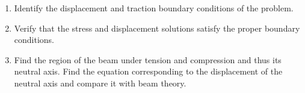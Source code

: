 \begin{enumerate}

\begin{enumerate}
\item Identify the displacement and traction boundary conditions of the problem.
\item Verify that the stress and displacement solutions satisfy the proper boundary conditions.
\item  Find the region of the beam under tension and compression and thus its neutral axis. Find the equation corresponding to the displacement of the neutral axis and compare it with beam theory.
\end{enumerate}

\end{enumerate}




